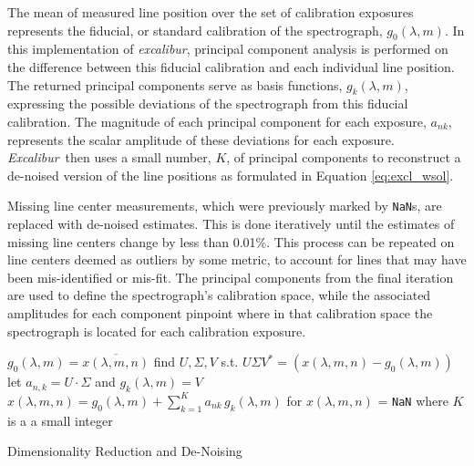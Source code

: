 \documentclass[twocolumn,table,xcolor,trackchanges]{aastex63} %
\newcommand{\project}[1]{\textsl{#1}}
\newcommand{\name}{\project{excalibur}}
\newcommand{\Name}{\project{Excalibur}}
\newcommand{\code}[1]{\texttt{#1}}
\providecommand{\DIFadd}[1]{{\protect\color{blue}\uwave{#1}}} %
\providecommand{\DIFaddbegin}{} %
\providecommand{\DIFaddend}{} %
\providecommand{\DIFdelbegin}{} %
\providecommand{\DIFdelend}{} %
\begin{document}
The mean of measured line position over the set of calibration exposures represents the fiducial, or standard calibration of the spectrograph, $g_0(\lambda,m)$.  In this implementation of \name, principal component analysis is performed on the difference between this fiducial calibration and each individual line position.  The returned principal components serve as basis functions,  $g_k(\lambda,m)$, expressing the possible deviations of the spectrograph from this fiducial calibration.  The magnitude of each principal component for each exposure, $a_{nk}$, represents the scalar amplitude of these deviations for each exposure.  \Name\ then uses a small number, $K$, of principal components to reconstruct a de-noised version of the line positions as formulated in Equation \ref{eq:excl_wsol}.

Missing line center measurements, which were previously marked by \code{NaN}s, are replaced with de-noised estimates.  This is done iteratively until the estimates of missing line centers change by less than 0.01\%.  This process can be repeated on line centers deemed as outliers by some metric, to account for lines that may have been mis-identified or mis-fit.  The principal components from the final iteration are used to define the spectrograph's calibration space, while the associated amplitudes for each component pinpoint where in that calibration space the spectrograph is located for each calibration exposure.

\begin{algorithm}
\SetAlgoLined
{}
\DIFdelbegin %
\DIFdelend \DIFaddbegin {}
\DIFaddend {}
{
	$g_0(\lambda,m) = \overline{x(\lambda,m,n)}$\;
	\DIFaddbegin \DIFadd{using Singular-Value Decomposition, }\DIFaddend find $U, \Sigma, V$ s.t. $U\Sigma V^* = (x(\lambda,m,n)-g_0(\lambda,m))$\;
	let $a_{n,k} = U\cdot \Sigma$ and $g_k(\lambda,m) = V$\;
	$x(\lambda,m,n) = g_0(\lambda,m) + \sum_{k=1}^K a_{nk}\,g_k(\lambda,m)$ for $x(\lambda,m,n)$ = \code{NaN} where $K$ is a a small integer
	}
\caption{Dimensionality Reduction and De-Noising}
\end{algorithm}
\end{document}
